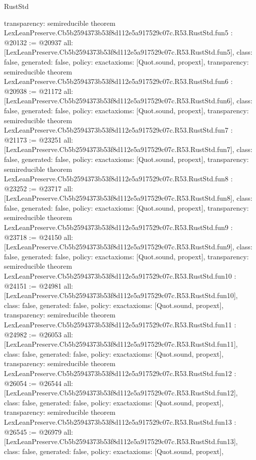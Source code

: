 \begin{lexlean}{RustStd}
\begin{coremodule}
{  transparency: semireducible
}
theorem LexLeanPreserve.Cb5b2594373b53f8d112e5a917529c07c.R53.RustStd.fun5 : @20132 := @20937 {
  all: [LexLeanPreserve.Cb5b2594373b53f8d112e5a917529c07c.R53.RustStd.fun5],
  class: false,
  generated: false,
  policy: exact{axioms: [Quot.sound, propext]},
  transparency: semireducible
}
theorem LexLeanPreserve.Cb5b2594373b53f8d112e5a917529c07c.R53.RustStd.fun6 : @20938 := @21172 {
  all: [LexLeanPreserve.Cb5b2594373b53f8d112e5a917529c07c.R53.RustStd.fun6],
  class: false,
  generated: false,
  policy: exact{axioms: [Quot.sound, propext]},
  transparency: semireducible
}
theorem LexLeanPreserve.Cb5b2594373b53f8d112e5a917529c07c.R53.RustStd.fun7 : @21173 := @23251 {
  all: [LexLeanPreserve.Cb5b2594373b53f8d112e5a917529c07c.R53.RustStd.fun7],
  class: false,
  generated: false,
  policy: exact{axioms: [Quot.sound, propext]},
  transparency: semireducible
}
theorem LexLeanPreserve.Cb5b2594373b53f8d112e5a917529c07c.R53.RustStd.fun8 : @23252 := @23717 {
  all: [LexLeanPreserve.Cb5b2594373b53f8d112e5a917529c07c.R53.RustStd.fun8],
  class: false,
  generated: false,
  policy: exact{axioms: [Quot.sound, propext]},
  transparency: semireducible
}
theorem LexLeanPreserve.Cb5b2594373b53f8d112e5a917529c07c.R53.RustStd.fun9 : @23718 := @24150 {
  all: [LexLeanPreserve.Cb5b2594373b53f8d112e5a917529c07c.R53.RustStd.fun9],
  class: false,
  generated: false,
  policy: exact{axioms: [Quot.sound, propext]},
  transparency: semireducible
}
theorem LexLeanPreserve.Cb5b2594373b53f8d112e5a917529c07c.R53.RustStd.fun10 : @24151 := @24981 {
  all: [LexLeanPreserve.Cb5b2594373b53f8d112e5a917529c07c.R53.RustStd.fun10],
  class: false,
  generated: false,
  policy: exact{axioms: [Quot.sound, propext]},
  transparency: semireducible
}
theorem LexLeanPreserve.Cb5b2594373b53f8d112e5a917529c07c.R53.RustStd.fun11 : @24982 := @26053 {
  all: [LexLeanPreserve.Cb5b2594373b53f8d112e5a917529c07c.R53.RustStd.fun11],
  class: false,
  generated: false,
  policy: exact{axioms: [Quot.sound, propext]},
  transparency: semireducible
}
theorem LexLeanPreserve.Cb5b2594373b53f8d112e5a917529c07c.R53.RustStd.fun12 : @26054 := @26544 {
  all: [LexLeanPreserve.Cb5b2594373b53f8d112e5a917529c07c.R53.RustStd.fun12],
  class: false,
  generated: false,
  policy: exact{axioms: [Quot.sound, propext]},
  transparency: semireducible
}
theorem LexLeanPreserve.Cb5b2594373b53f8d112e5a917529c07c.R53.RustStd.fun13 : @26545 := @26979 {
  all: [LexLeanPreserve.Cb5b2594373b53f8d112e5a917529c07c.R53.RustStd.fun13],
  class: false,
  generated: false,
  policy: exact{axioms: [Quot.sound, propext]},
}
\end{coremodule}
\end{lexlean}
